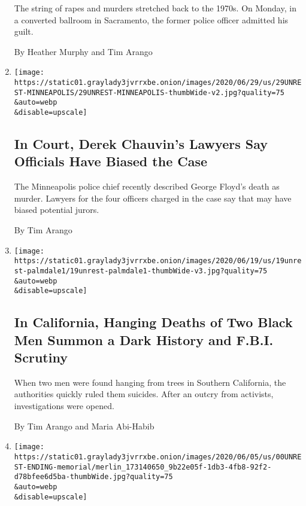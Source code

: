 \begin{enumerate}
  The string of rapes and murders stretched back to the 1970s. On
  Monday, in a converted ballroom in Sacramento, the former police
  officer admitted his guilt.

  By Heather Murphy and Tim Arango
\item
  \href{/2020/06/29/us/derek-chauvin-court-hearing.html}{}

  \texttt{[image: https://static01.graylady3jvrrxbe.onion/images/2020/06/29/us/29UNREST-MINNEAPOLIS/29UNREST-MINNEAPOLIS-thumbWide-v2.jpg?quality=75\\\&auto=webp\\\&disable=upscale]}

  \hypertarget{in-court-derek-chauvins-lawyers-say-officials-have-biased-the-case}{%
  \subsection{In Court, Derek Chauvin's Lawyers Say Officials Have
  Biased the
  Case}\label{in-court-derek-chauvins-lawyers-say-officials-have-biased-the-case}}

  The Minneapolis police chief recently described George Floyd's death
  as murder. Lawyers for the four officers charged in the case say that
  may have biased potential jurors.

  By Tim Arango
\item
  \href{/2020/06/19/us/hanging-deaths-california.html}{}

  \texttt{[image: https://static01.graylady3jvrrxbe.onion/images/2020/06/19/us/19unrest-palmdale1/19unrest-palmdale1-thumbWide-v3.jpg?quality=75\\\&auto=webp\\\&disable=upscale]}

  \hypertarget{in-california-hanging-deaths-of-two-black-men-summon-a-dark-history-and-fbi-scrutiny}{%
  \subsection{In California, Hanging Deaths of Two Black Men Summon a
  Dark History and F.B.I.
  Scrutiny}\label{in-california-hanging-deaths-of-two-black-men-summon-a-dark-history-and-fbi-scrutiny}}

  When two men were found hanging from trees in Southern California, the
  authorities quickly ruled them suicides. After an outcry from
  activists, investigations were opened.

  By Tim Arango and Maria Abi-Habib
\item
  \href{/2020/06/07/us/unrest-protests-minneapolis-ending.html}{}

  \texttt{[image: https://static01.graylady3jvrrxbe.onion/images/2020/06/05/us/00UNREST-ENDING-memorial/merlin\_173140650\_9b22e05f-1db3-4fb8-92f2-d78bfee6d5ba-thumbWide.jpg?quality=75\\\&auto=webp\\\&disable=upscale]}


\end{enumerate}
